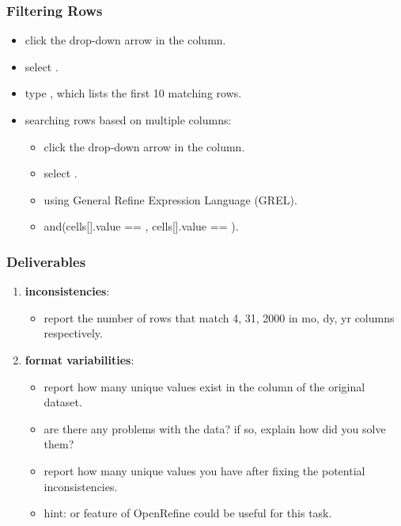 \documentclass{beamer}					%
\begin{document}
\begin{frame}[c]
\frametitle{Filtering Rows}
\begin{itemize}
\item click the drop-down arrow in the  column.
\item select \say{\textcolor{red}{Text Filter}}.
\item type , which lists the first 10 matching rows.
\item searching rows based on multiple columns:
\begin{itemize}
\item click the drop-down arrow in the  column.
\item select \say{\textcolor{red}{Facet\textgreater Custom text facet...}}.
\item using General Refine Expression Language (GREL).
\item and(cells[].value == , cells[].value == ).
\end{itemize}
\end{itemize}
\end{frame}

 \begin{frame}[c]
 \frametitle{Deliverables}
 \begin{enumerate}
 \item \textbf{inconsistencies}: 
 \begin{itemize}
\item report the number of rows that match 4, 31, 2000 in mo, dy, yr columns respectively.
\end{itemize}
\item \textbf{format variabilities}:
\begin{itemize}
\item report how many unique values exist in the  column of the original dataset.
\item are there any problems with the data? if so, explain how did you solve them? 
\item report how many unique values you have after fixing the potential inconsistencies.
\item hint:  or  feature of OpenRefine could be useful for this task.
 \end{itemize}
\setcounter{enumTemp}{\theenumi}
 \end{enumerate}
\end{frame}
\end{document}
